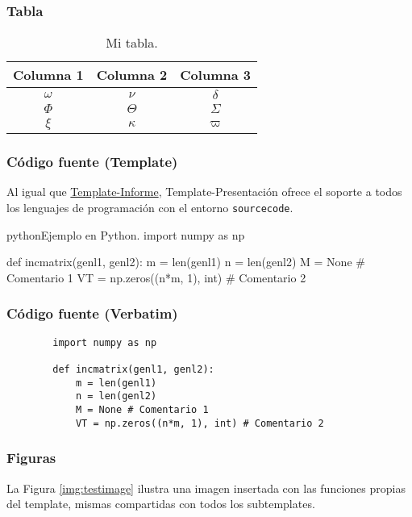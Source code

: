 \begin{frame}
	\frametitle{Tabla}
	\begin{table}
		\centering
		\caption{Mi tabla.}
		\begin{tabular}{ccc}
			\hline
			\textbf{Columna 1} & \textbf{Columna 2} & \textbf{Columna 3} \bigstrut\\
			\hline
			$\omega$ & $\nu$ & $\delta$ \bigstrut[t]\\
			$\Phi$ & $\Theta$ & $\varSigma$ \\
			$\xi$ & $\kappa$ & $\varpi$ \bigstrut[b] \\
			\hline
		\end{tabular}
	\end{table}
\end{frame}


\begin{frame}[fragile]
	\frametitle{Código fuente (Template)}
	Al igual que \href{https://latex.ppizarror.com/informe}{Template-Informe}, Template-Presentación ofrece el soporte a todos los lenguajes de programación con el entorno \texttt{sourcecode}.
\begin{sourcecode}{python}{Ejemplo en Python.}
import numpy as np

def incmatrix(genl1, genl2):
	m = len(genl1)
	n = len(genl2)
	M = None # Comentario 1
	VT = np.zeros((n*m, 1), int) # Comentario 2
\end{sourcecode}
\end{frame}


\begin{frame}[fragile]
	\frametitle{Código fuente (Verbatim)}
	\begin{example}
		\begin{verbatim}
		import numpy as np

		def incmatrix(genl1, genl2):
			m = len(genl1)
			n = len(genl2)
			M = None # Comentario 1
			VT = np.zeros((n*m, 1), int) # Comentario 2
		\end{verbatim}
	\end{example}
\end{frame}


\begin{frame}
	\frametitle{Figuras}
	La Figura \ref{img:testimage} ilustra una imagen insertada con las funciones propias del template, mismas compartidas con todos los subtemplates.
	
\end{frame}

